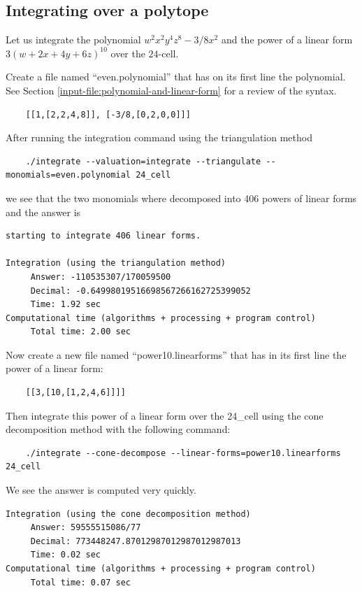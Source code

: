 \documentclass{article}
\begin{document}
\subsection{Integrating over a polytope}

Let us integrate the polynomial $w^2x^2y^4z^8 -3/8x^2$ and the power of a linear form $3(w +2x + 4y + 6z)^{10}$ over the $24$-cell.

 

Create a file named ``even.polynomial'' that has on its first line the polynomial. See Section \ref{input-file:polynomial-and-linear-form} for a review of the syntax.
	
	\begin{verbatim}
	[[1,[2,2,4,8]], [-3/8,[0,2,0,0]]]
	\end{verbatim}

After running the integration command using the triangulation method
	\begin{verbatim}
	./integrate --valuation=integrate --triangulate --monomials=even.polynomial 24_cell
	\end{verbatim}


we see that the two monomials where decomposed into 406 powers of linear forms and the answer is


\begin{verbatim}
starting to integrate 406 linear forms.

Integration (using the triangulation method)
     Answer: -110535307/170059500
     Decimal: -0.64998019516698567266162725399052
     Time: 1.92 sec
Computational time (algorithms + processing + program control)
     Total time: 2.00 sec
\end{verbatim}



Now create a new file named ``power10.linearforms'' that has in its first line the power of a linear form:

	\begin{verbatim}
	[[3,[10,[1,2,4,6]]]]
	\end{verbatim}
	
Then integrate this power of a linear form over the 24\_cell using the cone decomposition method with the following command:	
	\begin{verbatim}
	./integrate --cone-decompose --linear-forms=power10.linearforms  24_cell
	\end{verbatim}
	
We see the answer is computed very quickly.
	
\begin{verbatim}	
Integration (using the cone decomposition method)
     Answer: 59555515086/77
     Decimal: 773448247.87012987012987012987013
     Time: 0.02 sec
Computational time (algorithms + processing + program control)
     Total time: 0.07 sec
\end{verbatim}	
	
\end{document}
